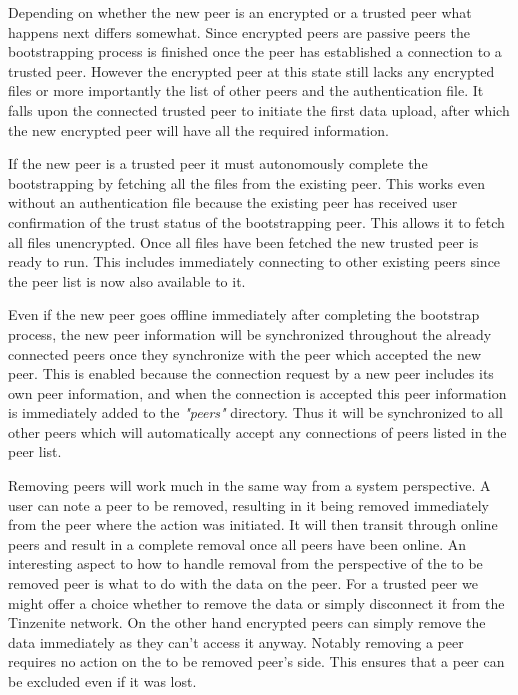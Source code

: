 Depending on whether the new peer is an encrypted or a trusted peer what happens next differs somewhat.
Since encrypted peers are passive peers the bootstrapping process is finished once the peer has established a connection to a trusted peer.
However the encrypted peer at this state still lacks any encrypted files or more importantly the list of other peers and the authentication file.
It falls upon the connected trusted peer to initiate the first data upload, after which the new encrypted peer will have all the required information.

If the new peer is a trusted peer it must autonomously complete the bootstrapping by fetching all the files from the existing peer.
This works even without an authentication file because the existing peer has received user confirmation of the trust status of the bootstrapping peer.
This allows it to fetch all files unencrypted.
Once all files have been fetched the new trusted peer is ready to run.
This includes immediately connecting to other existing peers since the peer list is now also available to it.

Even if the new peer goes offline immediately after completing the bootstrap process, the new peer information will be synchronized throughout the already connected peers once they synchronize with the peer which accepted the new peer.
This is enabled because the connection request by a new peer includes its own peer information, and when the connection is accepted this peer information is immediately added to the \textit{"peers"} directory.
Thus it will be synchronized to all other peers which will automatically accept any connections of peers listed in the peer list.

Removing peers will work much in the same way from a system perspective.
A user can note a peer to be removed, resulting in it being removed immediately from the peer where the action was initiated.
It will then transit through online peers and result in a complete removal once all peers have been online.
An interesting aspect to how to handle removal from the perspective of the to be removed peer is what to do with the data on the peer.
For a trusted peer we might offer a choice whether to remove the data or simply disconnect it from the Tinzenite network.
On the other hand encrypted peers can simply remove the data immediately as they can't access it anyway.
Notably removing a peer requires no action on the to be removed peer's side.
This ensures that a peer can be excluded even if it was lost.

